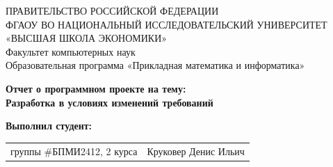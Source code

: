 \begin{titlepage}
\newpage

{
\begin{center}
ПРАВИТЕЛЬСТВО РОССИЙСКОЙ ФЕДЕРАЦИИ\\
ФГАОУ ВО НАЦИОНАЛЬНЫЙ ИССЛЕДОВАТЕЛЬСКИЙ УНИВЕРСИТЕТ\\
«ВЫСШАЯ ШКОЛА ЭКОНОМИКИ»
\\
\bigskip
Факультет компьютерных наук\\
Образовательная программа «Прикладная математика и информатика»
\end{center}
}

\vspace{2em}
\vspace{4em}

\begin{center}
{\bf Отчет о программном проекте на тему:}\\
{\bf Разработка в условиях изменений требований}\\
\end{center}

\vspace{2em}

{\bf Выполнил студент: \vspace{2mm}}

{
\begin{tabular}{l@{\hskip 1.5cm}l}
группы \#БПМИ2412, 2 курса & Круковер Денис Ильич \\
\end{tabular}}



\end{titlepage}
